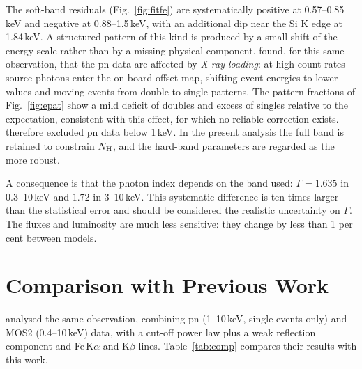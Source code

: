 \documentclass[11pt,a4paper]{article}
\newcommand{\nh}{N_{\rm H}}
\begin{document}
The soft-band residuals (Fig.~\ref{fig:fitfe}) are systematically positive at 0.57--0.85\,keV and negative at 0.88--1.5\,keV, with an additional dip near the Si K edge at 1.84\,keV. A structured pattern of this kind is produced by a small shift of the energy scale rather than by a missing physical component. \cite{ballo11} found, for this same observation, that the pn data are affected by \emph{X-ray loading}: at high count rates source photons enter the on-board offset map, shifting event energies to lower values and moving events from double to single patterns. The pattern fractions of Fig.~\ref{fig:epat} show a mild deficit of doubles and excess of singles relative to the expectation, consistent with this effect, for which no reliable correction exists. \cite{ballo11} therefore excluded pn data below 1\,keV. In the present analysis the full band is retained to constrain $\nh$, and the hard-band parameters are regarded as the more robust.

A consequence is that the photon index depends on the band used: $\Gamma=1.635$ in 0.3--10\,keV and $1.72$ in 3--10\,keV. This systematic difference is ten times larger than the statistical error and should be considered the realistic uncertainty on $\Gamma$. The fluxes and luminosity are much less sensitive: they change by less than 1 per cent between models.

\section{Comparison with Previous Work}

\cite{ballo11} analysed the same observation, combining pn (1--10\,keV, single events only) and MOS2 (0.4--10\,keV) data, with a cut-off power law plus a weak reflection component and Fe\,K$\alpha$ and K$\beta$ lines. Table~\ref{tab:comp} compares their results with this work.
\end{document}
